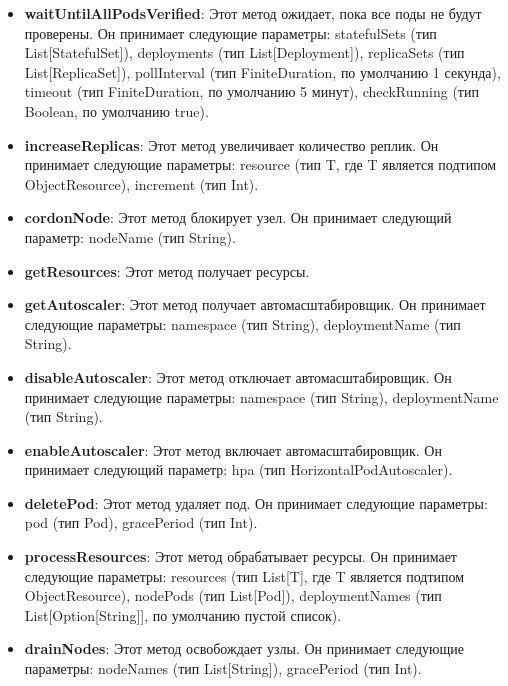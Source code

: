 \begin{itemize}

\item \textbf{waitUntilAllPodsVerified}: Этот метод ожидает, пока все поды не
будут проверены. Он принимает следующие параметры: statefulSets (тип
List[StatefulSet]), deployments (тип List[Deployment]), replicaSets (тип
List[ReplicaSet]), pollInterval (тип FiniteDuration, по умолчанию 1 секунда),
timeout (тип FiniteDuration, по умолчанию 5 минут), checkRunning (тип Boolean,
по умолчанию true).

\item \textbf{increaseReplicas}: Этот метод увеличивает количество реплик. Он
принимает следующие параметры: resource (тип T, где T является подтипом
ObjectResource), increment (тип Int).

\item \textbf{cordonNode}: Этот метод блокирует узел. Он принимает следующий
параметр: nodeName (тип String).

\item \textbf{getResources}: Этот метод получает ресурсы.

\item \textbf{getAutoscaler}: Этот метод получает автомасштабировщик. Он
принимает следующие параметры: namespace (тип String), deploymentName (тип
String).

\item \textbf{disableAutoscaler}: Этот метод отключает автомасштабировщик. Он
принимает следующие параметры: namespace (тип String), deploymentName (тип
String).

\item \textbf{enableAutoscaler}: Этот метод включает автомасштабировщик. Он
принимает следующий параметр: hpa (тип HorizontalPodAutoscaler).

\item \textbf{deletePod}: Этот метод удаляет под. Он принимает следующие
параметры: pod (тип Pod), gracePeriod (тип Int).

\item \textbf{processResources}: Этот метод обрабатывает ресурсы. Он принимает
следующие параметры: resources (тип List[T], где T является подтипом
ObjectResource), nodePods (тип List[Pod]), deploymentNames (тип
List[Option[String]], по умолчанию пустой список).

\item \textbf{drainNodes}: Этот метод освобождает узлы. Он принимает следующие
параметры: nodeNames (тип List[String]), gracePeriod (тип Int).

\end{itemize}


